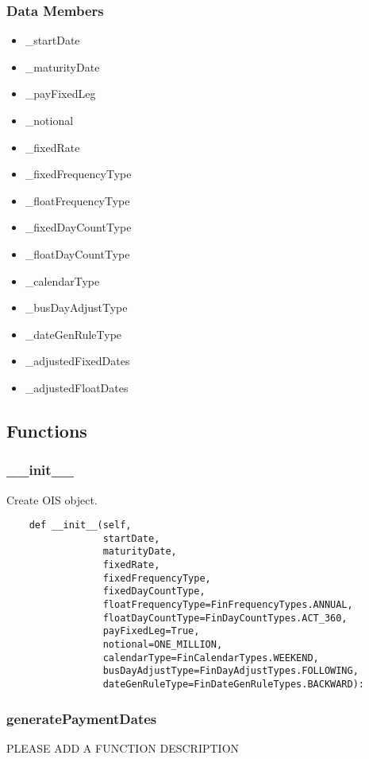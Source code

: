 \documentclass[twoside,11pt]{book}
\begin{document}
\subsubsection*{Data Members}
\begin{itemize}
\item{\_startDate}
\item{\_maturityDate}
\item{\_payFixedLeg}
\item{\_notional}
\item{\_fixedRate}
\item{\_fixedFrequencyType}
\item{\_floatFrequencyType}
\item{\_fixedDayCountType}
\item{\_floatDayCountType}
\item{\_calendarType}
\item{\_busDayAdjustType}
\item{\_dateGenRuleType}
\item{\_adjustedFixedDates}
\item{\_adjustedFloatDates}
\end{itemize}

\subsection*{Functions}

\subsubsection*{{\bf \_\_init\_\_}}
Create OIS object.  

\begin{lstlisting}
    def __init__(self,
                 startDate,
                 maturityDate,
                 fixedRate,
                 fixedFrequencyType,
                 fixedDayCountType,
                 floatFrequencyType=FinFrequencyTypes.ANNUAL,
                 floatDayCountType=FinDayCountTypes.ACT_360,
                 payFixedLeg=True,
                 notional=ONE_MILLION,
                 calendarType=FinCalendarTypes.WEEKEND,
                 busDayAdjustType=FinDayAdjustTypes.FOLLOWING,
                 dateGenRuleType=FinDateGenRuleTypes.BACKWARD):
\end{lstlisting}

\subsubsection*{{\bf generatePaymentDates}}
PLEASE ADD A FUNCTION DESCRIPTION
\end{document}
